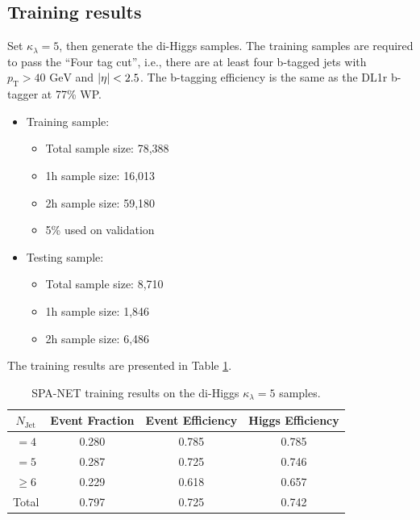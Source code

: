 \documentclass[12pt]{article}
\begin{document}
	\subsection{Training results}%
	\label{sub:training_results_k5}
		Set $\kappa_\lambda = 5$, then generate the di-Higgs samples. The training samples are required to pass the ``Four tag cut'', i.e., there are at least four b-tagged jets with $p_{\text{T}} > \text{40 GeV}$ and $\abs{\eta} < 2.5$. The b-tagging efficiency is the same as the DL1r b-tagger at 77\% WP.
		\begin{itemize}
			\item Training sample:
			\begin{itemize}
				\item Total sample size: 78,388
				\item 1h sample size: 16,013
				\item 2h sample size: 59,180
				\item 5\% used on validation
			\end{itemize}
			\item Testing sample: 
			\begin{itemize}
				\item Total sample size: 8,710
				\item 1h sample size: 1,846
				\item 2h sample size: 6,486
			\end{itemize}
		\end{itemize}
		The training results are presented in Table \ref{tab:SPANet_diHiggs_4btag_DL1r_pt40_k5}.
		\begin{table}[htpb]
			\centering
			\caption{SPA-NET training results on the di-Higgs $\kappa_\lambda =5$ samples.}
			\label{tab:SPANet_diHiggs_4btag_DL1r_pt40_k5}
			\begin{tabular}{c|c|cc}
				$N_\text{Jet}$ & Event Fraction & Event Efficiency & Higgs Efficiency \\
				\hline
				$=4$	  &   0.280             &    0.785              &    0.785             \\
				$=5$	  &   0.287             &    0.725              &    0.746             \\
				$\ge 6$	  &   0.229             &    0.618              &    0.657             \\
				Total	  &   0.797             &    0.725              &    0.742             \\
			\end{tabular}
		\end{table}
\end{document}
